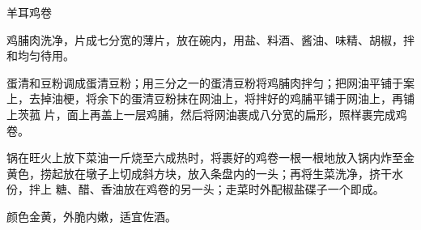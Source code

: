 %
%
%
%
%
%
%
\begin{recipe}{羊耳鸡卷}

\ingredients


\preparation

\step 鸡脯肉洗净，片成七分宽的薄片，放在碗内，用盐、料酒、酱油、味精、胡椒，拌
和均匀待用。

\step 蛋清和豆粉调成蛋清豆粉；用三分之一的蛋清豆粉将鸡脯肉拌匀；把网油平铺于案
上，去掉油梗，将余下的蛋清豆粉抹在网油上，将拌好的鸡脯平铺于网油上，再铺上茨菰
片，面上再盖上一层鸡脯，然后将网油裹成八分宽的扁形，照样裹完成鸡卷。

\step 锅在旺火上放下菜油一斤烧至六成热时，将裹好的鸡卷一根一根地放入锅内炸至金
黄色，捞起放在墩子上切成斜方块，放入条盘内的一头；再将生菜洗净，挤干水份，拌上
糖、醋、香油放在鸡卷的另一头；走菜时外配椒盐碟子一个即成。

\features

颜色金黄，外脆内嫩，适宜佐酒。

\end{recipe}


